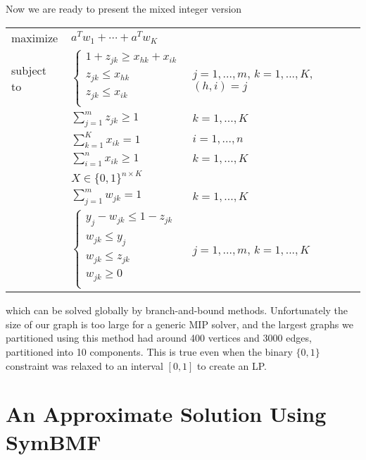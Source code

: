 Now we are ready to present the mixed integer version
\begin{center}
\bgroup
\def\arraystretch{1.5}
\begin{tabular}{l l l}
maximize   & $a^T w_1 + \cdots + a^T w_K$ \\
subject to 
           & $\begin{cases}
                 1 + z_{jk} \geq x_{hk} + x_{ik} \\
                 z_{jk} \leq x_{hk}             \\
                 z_{jk} \leq x_{ik}             \\
             \end{cases}$
           & $j = 1, ..., m$, $k = 1, ..., K$, $(h,i) = j$ \\
           & $\sum_{j=1}^m z_{jk} \geq 1$ & $k = 1, ..., K$ \\
           & $\sum_{k=1}^K x_{ik} = 1$ & $i = 1, ..., n$ \\
           & $\sum_{i=1}^n x_{ik} \geq 1$ & $k = 1, ..., K$ \\
           & $X \in \{0, 1\}^{n \times K}$ \\
           & $\sum_{j=1}^m w_{jk} = 1$ & $k = 1, ..., K$ \\
           & $\begin{cases}
                y_j - w_{jk} \leq 1 - z_{jk} \\
                w_{jk} \leq y_j \\
                w_{jk} \leq z_{jk} \\
                w_{jk} \geq 0 \\
             \end{cases}$
           & $j = 1, ..., m$, $k = 1, ..., K$ \\
\end{tabular}
\egroup
\end{center}
which can be solved globally by branch-and-bound methods.
Unfortunately the size of our graph is too large for a generic MIP
solver, and the largest graphs we partitioned using this method had
around 400 vertices and 3000 edges, partitioned into 10 components.
This is true even when the binary $\{0, 1\}$ constraint was relaxed
to an interval $[0, 1]$ to create an LP.


\section{An Approximate Solution Using SymBMF}

